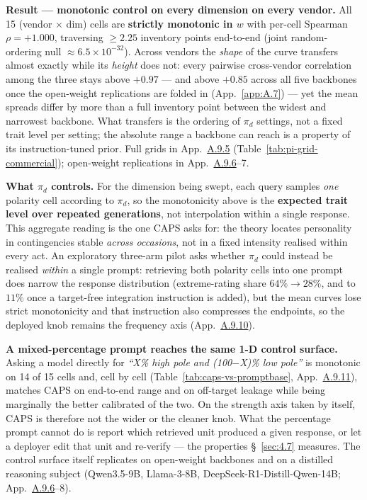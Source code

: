 \textbf{Result --- monotonic control on every dimension on every vendor.} All 15 (vendor $\times$ dim) cells are \textbf{strictly monotonic in $w$} with per-cell Spearman $\rho = +1.000$, traversing $\geq 2.25$ inventory points end-to-end (joint random-ordering null $\approx 6.5 \times 10^{-32}$). Across vendors the \textit{shape} of the curve transfers almost exactly while its \textit{height} does not: every pairwise cross-vendor correlation among the three stays above $+0.97$ --- and above $+0.85$ across all five backbones once the open-weight replications are folded in (App.~\ref{app:A.7}) --- yet the mean spreads differ by more than a full inventory point between the widest and narrowest backbone. What transfers is the ordering of $\pi_d$ settings, not a fixed trait level per setting; the absolute range a backbone can reach is a property of its instruction-tuned prior. Full grids in App.~\hyperref[app:A.9.5]{A.9.5} (Table~\ref{tab:pi-grid-commercial}); open-weight replications in App.~\hyperref[app:A.9.6]{A.9.6}--7.

\textbf{What $\pi_d$ controls.} For the dimension being swept, each query samples \textit{one} polarity cell according to $\pi_d$, so the monotonicity above is the \textbf{expected trait level over repeated generations}, not interpolation within a single response. This aggregate reading is the one CAPS asks for: the theory locates personality in contingencies stable \textit{across occasions}, not in a fixed intensity realised within every act. An exploratory three-arm pilot asks whether $\pi_d$ could instead be realised \textit{within} a single prompt: retrieving both polarity cells into one prompt does narrow the response distribution (extreme-rating share $64\% \to 28\%$, and to $11\%$ once a target-free integration instruction is added), but the mean curves lose strict monotonicity and that instruction also compresses the endpoints, so the deployed knob remains the frequency axis (App.~\hyperref[app:A.9.10]{A.9.10}).

\textbf{A mixed-percentage prompt reaches the same 1-D control surface.} Asking a model directly for \textit{``X\% high pole and (100$-$X)\% low pole''} is monotonic on 14 of 15 cells and, cell by cell (Table~\ref{tab:caps-vs-promptbase}, App.~\hyperref[app:A.9.11]{A.9.11}), matches CAPS on end-to-end range and on off-target leakage while being marginally the better calibrated of the two. On the strength axis taken by itself, CAPS is therefore not the wider or the cleaner knob. What the percentage prompt cannot do is report which retrieved unit produced a given response, or let a deployer edit that unit and re-verify --- the properties \S~\ref{sec:4.7} measures. The control surface itself replicates on open-weight backbones and on a distilled reasoning subject (Qwen3.5-9B, Llama-3-8B, DeepSeek-R1-Distill-Qwen-14B; App.~\hyperref[app:A.9.6]{A.9.6}--8).

